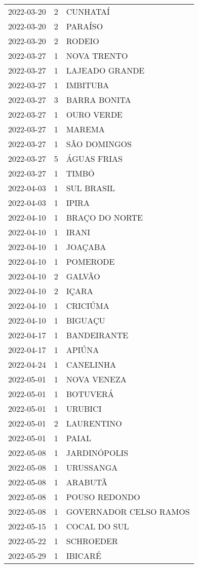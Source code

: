 \begin{longtable}[htbp]{ccl}
2022-03-20 & 2 & CUNHATAÍ \\
2022-03-20 & 2 & PARAÍSO \\
2022-03-20 & 2 & RODEIO \\
2022-03-27 & 1 & NOVA TRENTO \\
2022-03-27 & 1 & LAJEADO GRANDE \\
2022-03-27 & 1 & IMBITUBA \\
2022-03-27 & 3 & BARRA BONITA \\
2022-03-27 & 1 & OURO VERDE \\
2022-03-27 & 1 & MAREMA \\
2022-03-27 & 1 & SÃO DOMINGOS \\
2022-03-27 & 5 & ÁGUAS FRIAS \\
2022-03-27 & 1 & TIMBÓ \\
2022-04-03 & 1 & SUL BRASIL \\
2022-04-03 & 1 & IPIRA \\
2022-04-10 & 1 & BRAÇO DO NORTE \\
2022-04-10 & 1 & IRANI \\
2022-04-10 & 1 & JOAÇABA \\
2022-04-10 & 1 & POMERODE \\
2022-04-10 & 2 & GALVÃO \\
2022-04-10 & 2 & IÇARA \\
2022-04-10 & 1 & CRICIÚMA \\
2022-04-10 & 1 & BIGUAÇU \\
2022-04-17 & 1 & BANDEIRANTE \\
2022-04-17 & 1 & APIÚNA \\
2022-04-24 & 1 & CANELINHA \\
2022-05-01 & 1 & NOVA VENEZA \\
2022-05-01 & 1 & BOTUVERÁ \\
2022-05-01 & 1 & URUBICI \\
2022-05-01 & 2 & LAURENTINO \\
2022-05-01 & 1 & PAIAL \\
2022-05-08 & 1 & JARDINÓPOLIS \\
2022-05-08 & 1 & URUSSANGA \\
2022-05-08 & 1 & ARABUTÃ \\
2022-05-08 & 1 & POUSO REDONDO \\
2022-05-08 & 1 & GOVERNADOR CELSO RAMOS \\
2022-05-15 & 1 & COCAL DO SUL \\
2022-05-22 & 1 & SCHROEDER \\
2022-05-29 & 1 & IBICARÉ \\

\end{longtable}
